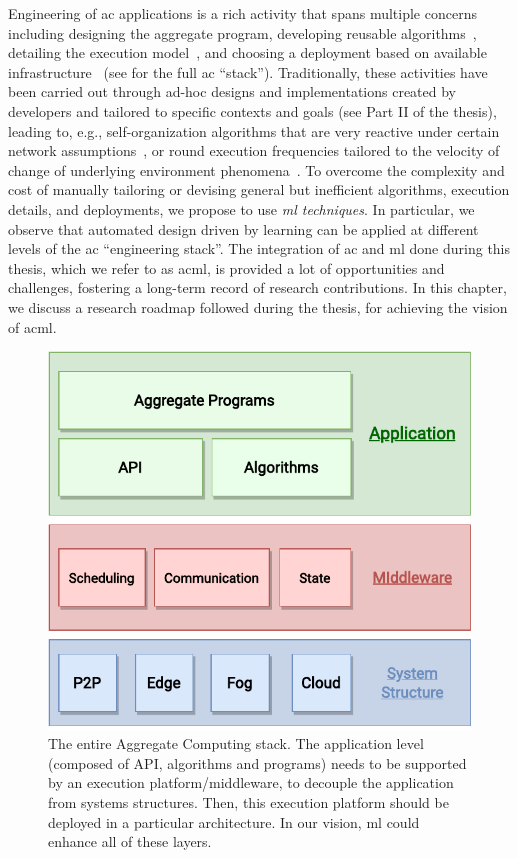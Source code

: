 Engineering of \ac{ac} applications 
 is a rich activity 
 that spans multiple concerns
 including
 designing the aggregate program,
 developing reusable algorithms~\cite{DBLP:conf/saso/AudritoCDV17,DBLP:journals/cee/AudritoCDPV21},  
 detailing the execution model~\cite{danilo2021lmcs},
 and choosing a deployment
 based on available infrastructure~\cite{DBLP:journals/fi/CasadeiPPVW20} (see  for the full \ac{ac} ``stack'').
%
Traditionally,
 these activities have been carried out 
 through ad-hoc designs and implementations
 created by developers
 and tailored to specific contexts and goals (see Part II of the thesis),
 leading to, e.g.,
 self-organization algorithms 
 that are very reactive under certain network assumptions~\cite{DBLP:journals/cee/AudritoCDPV21},
 or round execution frequencies tailored to the velocity of change of underlying environment phenomena~\cite{danilo2021lmcs}.
%
To overcome the complexity and cost 
 of manually tailoring or devising general but inefficient algorithms, execution details, 
 and deployments,
 we propose to use \emph{\ac{ml} techniques}.
%
In particular, we observe that 
 automated design
 driven by learning
 can be applied at different levels
 of the \ac{ac} ``engineering stack''.
%
The integration of \ac{ac} and \ac{ml} done during this thesis, 
 which we refer to as \ac{acml},
 is provided a lot of opportunities and challenges, 
 fostering a long-term record of research contributions.
%
In this chapter, we discuss a research roadmap followed during the thesis,
 for achieving the vision of \ac{acml}.


\begin{figure}[h]
\centering
  \includegraphics[width=0.8\linewidth]{papers/discoli/img/ac-rl.pdf}
  \caption[The aggregate computing stack]{The entire Aggregate Computing stack. 
  The application level (composed of API, algorithms and programs) needs to be supported by an execution platform/middleware, 
  to decouple the application from systems structures. 
  Then, this execution platform should be deployed in a particular architecture. 
  In our vision, \acl{ml} could enhance all of these layers.
  }
  \label{fig:architectures}
\end{figure}

